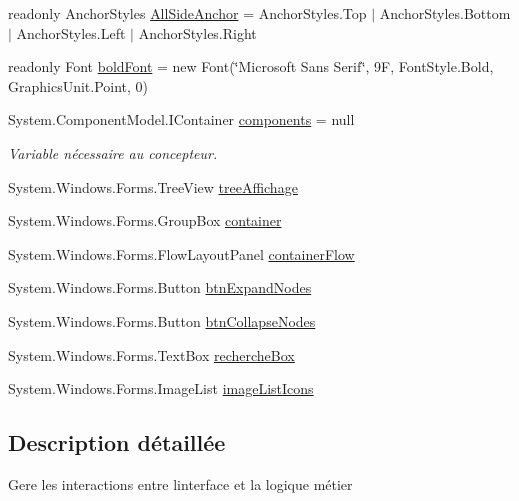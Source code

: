 \begin{DoxyCompactItemize}
\item 
readonly Anchor\+Styles \mbox{\hyperlink{class_m_t_connect_agent_1_1_user_control_display_tab_aa600efb65adb7313ed6e5ec98c84863c}{All\+Side\+Anchor}} = Anchor\+Styles.\+Top $\vert$ Anchor\+Styles.\+Bottom $\vert$ Anchor\+Styles.\+Left $\vert$ Anchor\+Styles.\+Right
\item 
readonly Font \mbox{\hyperlink{class_m_t_connect_agent_1_1_user_control_display_tab_a2de53bacd7b44a121af957bda6d0faa4}{bold\+Font}} = new Font(\char`\"{}Microsoft Sans Serif\char`\"{}, 9\+F, Font\+Style.\+Bold, Graphics\+Unit.\+Point, 0)
\item 
System.\+Component\+Model.\+I\+Container \mbox{\hyperlink{class_m_t_connect_agent_1_1_user_control_display_tab_a69ab804e102c9f7530a0441d2dd65da6}{components}} = null
\begin{DoxyCompactList}\small\item\em Variable nécessaire au concepteur. \end{DoxyCompactList}\item 
System.\+Windows.\+Forms.\+Tree\+View \mbox{\hyperlink{class_m_t_connect_agent_1_1_user_control_display_tab_ac4f4ff399ae001cb2d8774b58a4e5532}{tree\+Affichage}}
\item 
System.\+Windows.\+Forms.\+Group\+Box \mbox{\hyperlink{class_m_t_connect_agent_1_1_user_control_display_tab_a0f26e5be51a11045133d1bdd3b8ebaee}{container}}
\item 
System.\+Windows.\+Forms.\+Flow\+Layout\+Panel \mbox{\hyperlink{class_m_t_connect_agent_1_1_user_control_display_tab_a11dd621a8bf6a2d3b0be91f20fc0c9f0}{container\+Flow}}
\item 
System.\+Windows.\+Forms.\+Button \mbox{\hyperlink{class_m_t_connect_agent_1_1_user_control_display_tab_ad2e73116a8315b183e006850caa767ad}{btn\+Expand\+Nodes}}
\item 
System.\+Windows.\+Forms.\+Button \mbox{\hyperlink{class_m_t_connect_agent_1_1_user_control_display_tab_aa39615008797ebe155e99322a8a0e020}{btn\+Collapse\+Nodes}}
\item 
System.\+Windows.\+Forms.\+Text\+Box \mbox{\hyperlink{class_m_t_connect_agent_1_1_user_control_display_tab_a789854421cf3f00de88bc6bf168e4ada}{recherche\+Box}}
\item 
System.\+Windows.\+Forms.\+Image\+List \mbox{\hyperlink{class_m_t_connect_agent_1_1_user_control_display_tab_a4e0ab361176edf2f0a3b1f7bf0fe4f5d}{image\+List\+Icons}}
\end{DoxyCompactItemize}


\subsection{Description détaillée}
Gere les interactions entre l\textquotesingle{}interface et la logique métier 



